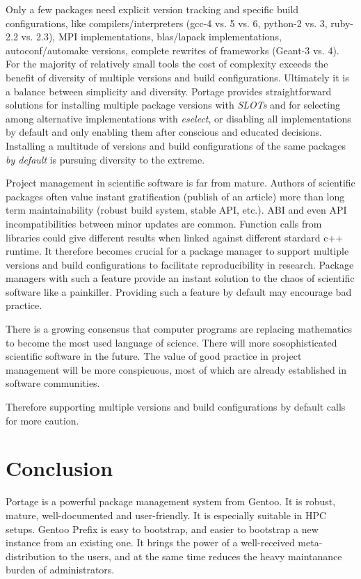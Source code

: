 \documentclass[a4paper,conference]{IEEEtran}
\begin{document}
Only a few packages need explicit version tracking and specific build
configurations, like compilers/interpreters (gcc-4 vs. 5 vs. 6,
python-2 vs. 3, ruby-2.2 vs. 2.3), MPI implementations, blas/lapack
implementations, autoconf/automake versions, complete rewrites of
frameworks (Geant-3 vs. 4). For the majority of relatively small
tools the cost of complexity exceeds the benefit of diversity of
multiple versions and build configurations. Ultimately it is a
balance between simplicity and diversity. Portage provides
straightforward solutions for installing multiple package versions
with \emph{SLOTs} and for selecting among alternative implementations
with \emph{eselect}, or disabling all implementations by
default and only enabling them after conscious and educated decisions.
Installing a multitude of versions and build configurations of the same
packages \emph{by default} is pursuing diversity to the extreme.

Project management in scientific software is far from mature. Authors
of scientific packages often value instant gratification (publish of
an article) more than long term maintainability (robust build system,
stable API, etc.). ABI and even API incompatibilities between minor
updates are common. Function calls from libraries could give
different results when linked against different stardard c++ runtime.
It therefore becomes crucial for a package manager to support multiple
versions and build configurations to facilitate reproducibility in
research. Package managers with such a feature provide an instant
solution to the chaos of scientific software like a painkiller.
Providing such a feature by default may encourage bad practice.

There is a growing consensus that computer programs are replacing
mathematics to become the most used language of science. There will more
sosophisticated scientific software in the future. The value of good
practice in project management will be more conspicuous, most of which
are already established in software communities.

Therefore supporting multiple versions and build configurations by
default calls for more caution.

\section{Conclusion}
\label{sec:conclusion}
Portage is a powerful package management system from Gentoo. It is
robust, mature, well-documented and user-friendly. It is especially
suitable in HPC setups. Gentoo Prefix is easy to bootstrap, and
easier to bootstrap a new instance from an existing one. It brings
the power of a well-received meta-distribution to the users, and at the
same time reduces the heavy maintanance burden of administrators.
\end{document}
